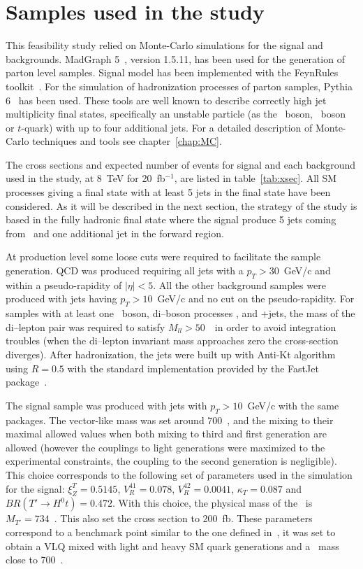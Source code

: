 
\section{Samples used in the study}
\label{sec:PhenoSam}

This feasibility study relied on Monte-Carlo simulations for the signal and backgrounds. MadGraph 5~\cite{Alwall:2014hca, Alwall:2011uj}, version 1.5.11, has been used for the generation of parton level samples. Signal model has been implemented with the FeynRules toolkit~\cite{Alloul:2013bka}. For the simulation of hadronization processes of parton samples, Pythia 6~\cite{Sjostrand:2006za} has been used. These tools are well known to describe correctly high jet multiplicity final states, specifically an unstable particle (as the \W~boson, \Z~boson or $t$-quark) with up to four additional jets. For a detailed description of Monte-Carlo techniques and tools see chapter~\ref{chap:MC}. 

The cross sections and expected number of events for signal and each background used in the study, at 8~TeV for 20~fb$^{-1}$, are listed in table~\ref{tab:xsec}. All SM processes giving a final state with at least 5 jets in the final state have been considered. As it will be described in the next section, the strategy of the study is based in the fully hadronic final state where the signal produce 5 jets coming from \Tp~and one additional jet in the forward region.

At production level some loose cuts were required to facilitate the sample generation. QCD was produced requiring all jets with a $p_{T}>30$~GeV/c and within a pseudo-rapidity of $|\eta|<5$. All the other background samples were produced with jets having $p_{T}>10$~GeV/c and no cut on the pseudo-rapidity. For samples with at least one \Z~boson, di--boson processes \Z\Z, \W\Z and \Z+jets, the mass of the di--lepton pair was required to satisfy $M_{ll}>50$~\GeVcc~in order to avoid integration troubles (when the di--lepton invariant mass approaches zero the cross-section diverges). After hadronization, the jets were built up with Anti-Kt algorithm using $R=0.5$ with the standard implementation provided by the FastJet package~\cite{Cacciari:2011ma}.

The signal sample was produced with jets with $p_{T}>10$~GeV/c with the same packages. The vector-like mass was set around 700~\GeVcc, and the mixing to their maximal allowed values when both mixing to third and first generation are allowed (however the couplings to light generations were maximized to the experimental constraints, the coupling to the second generation is negligible). This choice corresponds to the following set of parameters used in the simulation for the signal: $\xi_Z^{T}=0.5145$, $V_{R}^{41}=0.078$, $V_{R}^{42}=0.0041$, $\kappa_{T}=0.087$ and $BR(T' \to H^{0} t)=0.472$. With this choice, the physical mass of the \Tp~is $M_{T'}=734$~\GeVcc. This also set the cross section to 200~fb. These parameters correspond to a benchmark point similar to the one defined in~\cite{Cacciapaglia:2011fx}, it was set to obtain a VLQ mixed with light and heavy SM quark generations and a \Tp~mass close to 700~\GeVcc.

